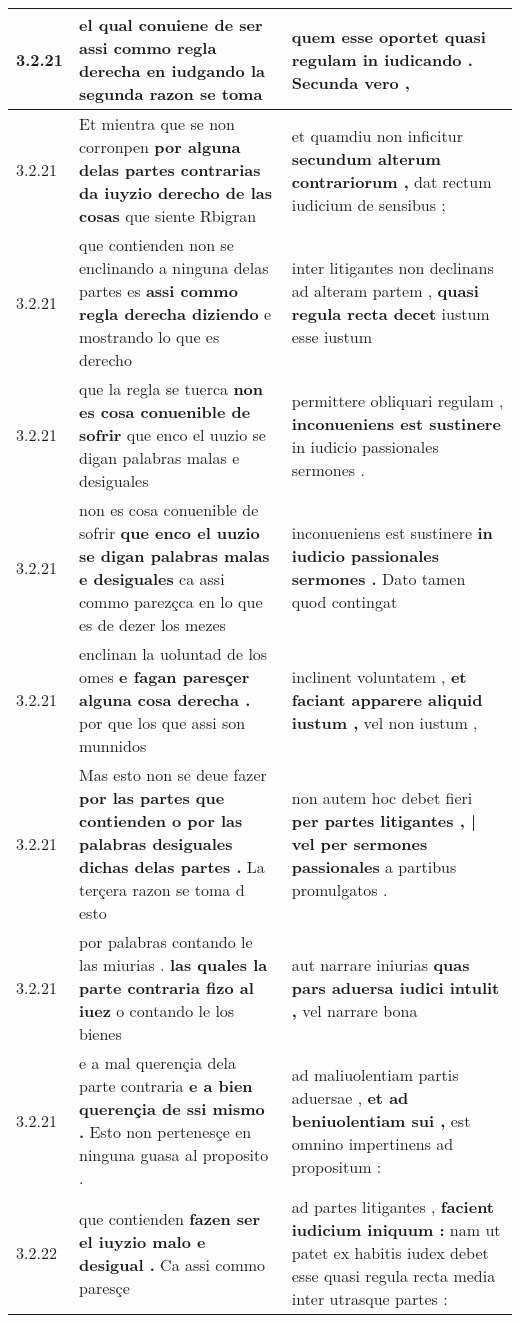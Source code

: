 \begin{tabular}{|p{1cm}|p{6.5cm}|p{6.5cm}|}
3.2.21 & el qual conuiene de ser \textbf{ assi commo regla derecha en } iudgando la segunda razon se toma & quem esse oportet \textbf{ quasi regulam in iudicando . } Secunda vero , \\\hline
3.2.21 & Et mientra que se non corronpen \textbf{ por alguna delas partes contrarias da iuyzio derecho de las cosas } que siente Rbigran & et quamdiu non inficitur \textbf{ secundum alterum contrariorum , } dat rectum iudicium de sensibus ; \\\hline
3.2.21 & que contienden non se enclinando a ninguna delas partes es \textbf{ assi commo regla derecha diziendo } e mostrando lo que es derecho & inter litigantes non declinans ad alteram partem , \textbf{ quasi regula recta decet } iustum esse iustum \\\hline
3.2.21 & que la regla se tuerca \textbf{ non es cosa conuenible de sofrir } que enco el uuzio se digan palabras malas e desiguales & permittere obliquari regulam , \textbf{ inconueniens est sustinere } in iudicio passionales sermones . \\\hline
3.2.21 & non es cosa conuenible de sofrir \textbf{ que enco el uuzio se digan palabras malas e desiguales } ca assi commo parezçca en lo que es de dezer los mezes & inconueniens est sustinere \textbf{ in iudicio passionales sermones . } Dato tamen quod contingat \\\hline
3.2.21 & enclinan la uoluntad de los omes \textbf{ e fagan paresçer alguna cosa derecha . } por que los que assi son munnidos & inclinent voluntatem , \textbf{ et faciant apparere aliquid iustum , } vel non iustum , \\\hline
3.2.21 & Mas esto non se deue fazer \textbf{ por las partes que contienden o por las palabras desiguales dichas delas partes . } La terçera razon se toma d esto & non autem hoc debet fieri \textbf{ per partes litigantes , | vel per sermones passionales } a partibus promulgatos . \\\hline
3.2.21 & por palabras contando le las miurias . \textbf{ las quales la parte contraria fizo al iuez } o contando le los bienes & aut narrare iniurias \textbf{ quas pars aduersa iudici intulit , } vel narrare bona \\\hline
3.2.21 & e a mal querençia dela parte contraria \textbf{ e a bien querençia de ssi mismo . } Esto non pertenesçe en ninguna guasa al proposito . & ad maliuolentiam partis aduersae , \textbf{ et ad beniuolentiam sui , } est omnino impertinens ad propositum : \\\hline
3.2.22 & que contienden \textbf{ fazen ser el iuyzio malo e desigual . } Ca assi commo paresçe & ad partes litigantes , \textbf{ facient iudicium iniquum : } nam ut patet ex habitis iudex debet esse quasi regula recta media inter utrasque partes : \\\hline

\end{tabular}
